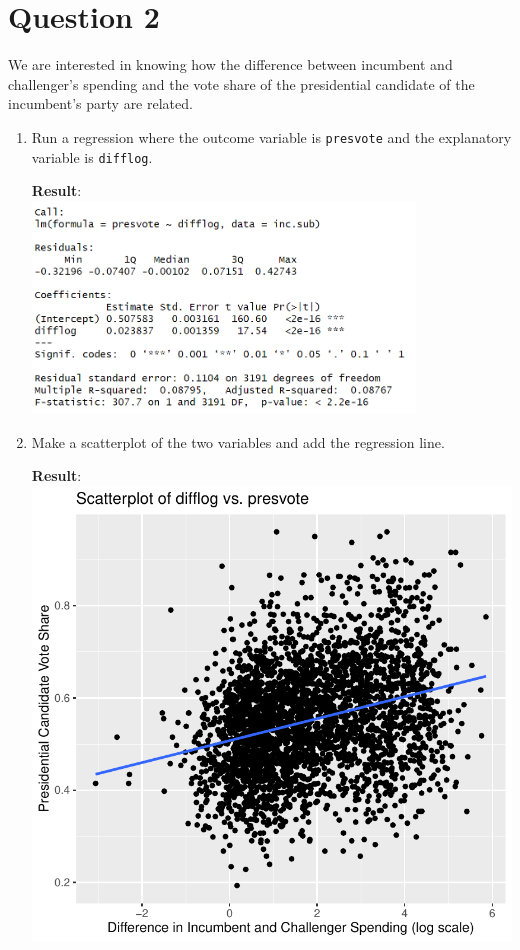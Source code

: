 \documentclass[12pt,letterpaper]{article}
\begin{document}
\section*{Question 2}
\noindent We are interested in knowing how the difference between incumbent and challenger's spending and the vote share of the presidential candidate of the incumbent's party are related.	\vspace{.25cm}
	\begin{enumerate}
		\item Run a regression where the outcome variable is \texttt{presvote} and the explanatory variable is \texttt{difflog}.	
			\vspace{.25cm}
			 
			\textbf{Result}:\\
			\includegraphics[width=0.8\textwidth]{plot_2a.png}
			\vspace{.25cm}
		\item Make a scatterplot of the two variables and add the regression line. 	
			\vspace{.25cm}
			 
			\textbf{Result}:\\
			\includegraphics[width=.85\textwidth]{plot_2b.pdf} 

\end{enumerate}
\end{document}
